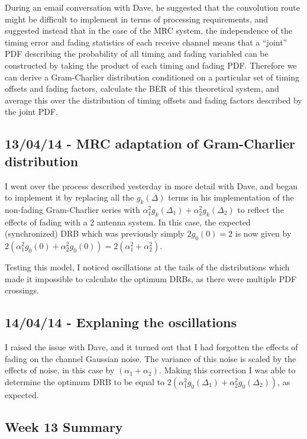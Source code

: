During an email conversation with Dave, he suggested that the
convolution route might be difficult to implement in terms of processing
requirements, and suggested instead that in the case of the MRC system,
the independence of the timing error and fading statistics of each
receive channel means that a ``joint'' PDF describing the probability of
all timing and fading variabled can be constructed by taking the product
of each timing and fading PDF. Therefore we can derive a Gram-Charlier
distribution conditioned on a particular set of timing offsets and
fading factors, calculate the BER of this theoretical system, and
average this over the distribution of timing offsets and fading factors
described by the joint PDF.

\subsection{13/04/14 - MRC adaptation of Gram-Charlier distribution}

I went over the process described yesterday in more detail with Dave,
and began to implement it by replacing all the $g_k(\Delta)$ terms in
his implementation of the non-fading Gram-Charlier series with
$\alpha_1^2 g_k(\Delta_1) + \alpha_2^2 g_k(\Delta_2)$ to reflect the
effects of fading with a 2 antenna system. In this case, the expected
(synchronized) DRB which was previously simply $2 g_0(0) = 2$ is now
given by
$2(\alpha_1^2 g_0(0) + \alpha_2^2 g_0(0)) = 2(\alpha_1^2 + \alpha_2^2)$.

Testing this model, I noticed oscillations at the tails of the
distributions which made it impossible to calculate the optimum DRBs, as
there were multiple PDF crossings.

\subsection{14/04/14 - Explaning the oscillations}

I raised the issue with Dave, and it turned out that I had forgotten the
effects of fading on the channel Gaussian noise. The variance of this
noise is scaled by the effects of noise, in this case by
$(\alpha_1 + \alpha_2)$. Making this correction I was able to determine
the optimum DRB to be equal to
$2(\alpha_1^2 g_0(\Delta_1) + \alpha_2^2 g_0(\Delta_2))$, as expected.

\subsection{Week 13 Summary}

